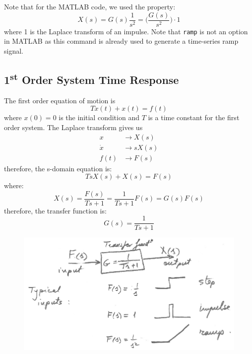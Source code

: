 \documentclass[12pt,letter]{article}
\begin{document}
Note that for the MATLAB code, we used the property:
\begin{equation}
X(s) = G(s) \frac{1}{s^2} = \Big(\frac{G(s)}{s^2}\Big) \cdot 1
\end{equation}
where 1 is the Laplace transform of an impulse. Note that \texttt{ramp} is not an option in MATLAB as this command is already used to generate a time-series ramp signal. 


\subsection{1\textsuperscript{st} Order System Time Response}

The first order equation of motion is
\begin{equation}
T \dot{x}(t) + x(t) = f(t)
\end{equation}
where $x(0)=0$ is the initial condition and $T$ is a time constant for the first order system. The Laplace transform gives us
\begin{align}
x & \rightarrow X(s) \\
\dot{x} & \rightarrow sX(s) \nonumber \\
f(t) & \rightarrow F(s) \nonumber 
\end{align}
therefore, the s-domain equation is:
\begin{equation}
TsX(s) + X(s) = F(s)
\end{equation}
where:
\begin{equation}
X(s) = \frac{F(s)}{T s + 1} = \frac{1}{Ts + 1}F(s) = G(s)F(s)
\end{equation}
therefore, the transfer function is:
\begin{equation}
G(s) = \frac{1}{T s + 1}
\end{equation}

\begin{figure}[H]
	\centering
	\includegraphics[width=5.5in]{../figures/time_response_1st_order}
\end{figure}
\end{document}
